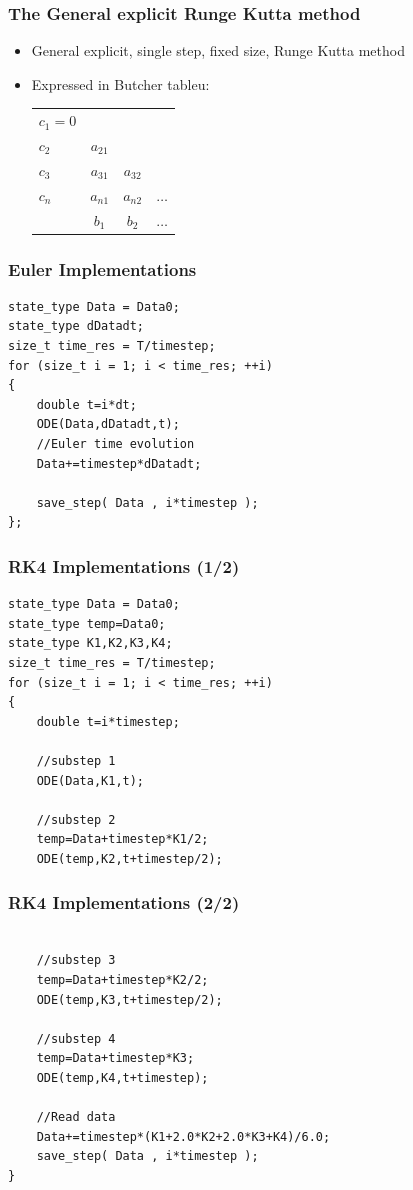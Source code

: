\documentclass{beamer}
\begin{document}
\begin{frame}
\frametitle{The General explicit Runge Kutta method}
\begin{itemize}

\item<1-> General explicit, single step, fixed size, Runge Kutta method

\item<2-> Expressed in Butcher tableu:

\begin{tabular}{l | @{\quad} c @{\quad} c @{\quad} c}
$c_1=0$ \\
$c_2$ & $a_{21}$\\
$c_3$ & $a_{31}$ &  $a_{32}$\\
$c_n$ & $a_{n1}$ &  $a_{n2}$ & $\hdots$\\
\midrule
& $b_1$ & $b_2$ & $\hdots$
\end{tabular}
\end{itemize}
\end{frame}


\begin{frame}[fragile]
\frametitle{Euler Implementations}
\begin{lstlisting}
state_type Data = Data0;
state_type dDatadt;
size_t time_res = T/timestep;
for (size_t i = 1; i < time_res; ++i)
{
    double t=i*dt;
    ODE(Data,dDatadt,t);
    //Euler time evolution
    Data+=timestep*dDatadt;

    save_step( Data , i*timestep );
};
\end{lstlisting}
\end{frame}





\begin{frame}[fragile]
\frametitle{RK4 Implementations (1/2)}
\begin{lstlisting}
state_type Data = Data0;
state_type temp=Data0;
state_type K1,K2,K3,K4;
size_t time_res = T/timestep;
for (size_t i = 1; i < time_res; ++i)
{
    double t=i*timestep;

    //substep 1
    ODE(Data,K1,t);

    //substep 2
    temp=Data+timestep*K1/2;
    ODE(temp,K2,t+timestep/2);
\end{lstlisting}
\end{frame}

\begin{frame}[fragile]
\frametitle{RK4 Implementations (2/2)}
\begin{lstlisting}

    //substep 3
    temp=Data+timestep*K2/2;
    ODE(temp,K3,t+timestep/2);

    //substep 4
    temp=Data+timestep*K3;
    ODE(temp,K4,t+timestep);

    //Read data
    Data+=timestep*(K1+2.0*K2+2.0*K3+K4)/6.0;
    save_step( Data , i*timestep );
}
\end{lstlisting}
\end{frame}
\end{document}
